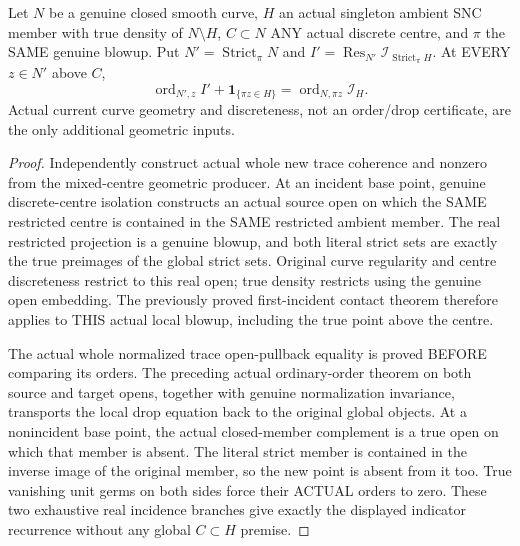\begin{theorem}
\label{hir:sharp-actual-mixed-curve-ambient-contact-evolution}
\leanok
Let $N$ be a genuine closed smooth curve, $H$ an actual singleton ambient
SNC member with true density of $N\setminus H$, $C\subset N$ ANY actual
discrete centre, and $\pi$ the SAME genuine blowup. Put
$N'=\operatorname{Strict}_\pi N$ and
$I'=\operatorname{Res}_{N'}\mathcal I_{\operatorname{Strict}_\pi H}$.
At EVERY $z\in N'$ above $C$,
\[
 \operatorname{ord}_{N',z} I'
   +\mathbf1_{\{\pi z\in H\}}
 =\operatorname{ord}_{N,\pi z}\mathcal I_H.
\]
Actual current curve geometry and discreteness, not an order/drop
certificate, are the only additional geometric inputs.
\end{theorem}
\begin{proof}
Independently construct actual whole new trace coherence and nonzero from
the mixed-centre geometric producer. At an incident base point, genuine
discrete-centre isolation constructs an actual source open on which the
SAME restricted centre is contained in the SAME restricted ambient member.
The real restricted projection is a genuine blowup, and both literal strict
sets are exactly the true preimages of the global strict sets. Original
curve regularity and centre discreteness restrict to this real open; true
density restricts using the genuine open embedding. The previously proved
first-incident contact theorem therefore applies to THIS actual local
blowup, including the true point above the centre.

The actual whole normalized trace open-pullback equality is proved BEFORE
comparing its orders. The preceding actual ordinary-order theorem on both
source and target opens, together with genuine normalization invariance,
transports the local drop equation back to the original global objects.
At a nonincident base point, the actual closed-member complement is a true
open on which that member is absent. The literal strict member is contained
in the inverse image of the original member, so the new point is absent
from it too. True vanishing unit germs on both sides force their ACTUAL
orders to zero. These two exhaustive real incidence branches give exactly
the displayed indicator recurrence without any global $C\subset H$ premise.
\end{proof}

